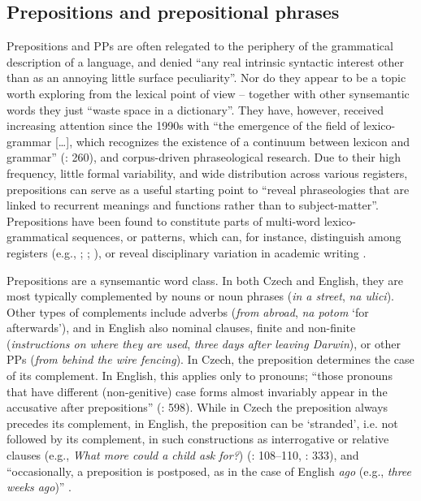 \documentclass[output=paper]{langscibook}
\begin{document}
\subsection{Prepositions and prepositional phrases}\label{sec:mala:1.1}

Prepositions and PPs are often relegated to the periphery of the grammatical description of a language, and denied “any real intrinsic syntactic interest other than as an annoying little surface peculiarity”. \citep[345]{Jackendoff1973} Nor do they appear to be a topic worth exploring from the lexical point of view – together with other synsemantic words they just “waste space in a dictionary”. \citep[81]{Sinclair1991} They have, however, received increasing attention since the 1990s with “the emergence of the field of lexico-grammar […], which recognizes the existence of a continuum between lexicon and grammar” (\citealt{CosmeGilquin2008}: 260), and corpus-driven phraseological research. Due to their high frequency, little formal variability, and wide distribution across various registers, prepositions can serve as a useful starting point to “reveal phraseologies that are linked to recurrent meanings and functions rather than to subject-matter”. \citep[292]{Hunston2008} Prepositions have been found to constitute parts of multi-word lexico-grammatical sequences, or patterns, which can, for instance, distinguish among registers (e.g., \citealt{ScottTribble2006}; \citealt{Hunston2008}; \citealt{Groom2010}), or reveal disciplinary variation in academic writing \citep{Groom2010}.

Prepositions are a synsemantic word class. In both Czech and English, they are most typically complemented by nouns or noun phrases (\textit{in a street}, \textit{na ulici}). Other types of complements include adverbs (\textit{from abroad}, \textit{na potom} ‘for afterwards’), and in English also nominal clauses, finite and non-finite (\textit{instructions on where they are used}, \textit{three days after leaving Darwin}), or other PPs (\textit{from behind the wire fencing}). In Czech, the preposition determines the case of its complement. In English, this applies only to pronouns; “those pronouns that have different (non-genitive) case forms almost invariably appear in the accusative after prepositions” (\citealt{HuddlestonPullum2002}: 598). While in Czech the preposition always precedes its complement, in English, the preposition can be ‘stranded’, i.e. not followed by its complement, in such constructions as interrogative or relative clauses (e.g., \textit{What more could a child ask for?}) (\citealt{BiberEtAl2021}: 108–110, \citealt{CvrčekEtAl2010}: 333), and “occasionally, a preposition is postposed, as in the case of English \textit{ago} (e.g., \textit{three weeks ago})” \citep[147]{Hasselgård2021}.
\end{document}
